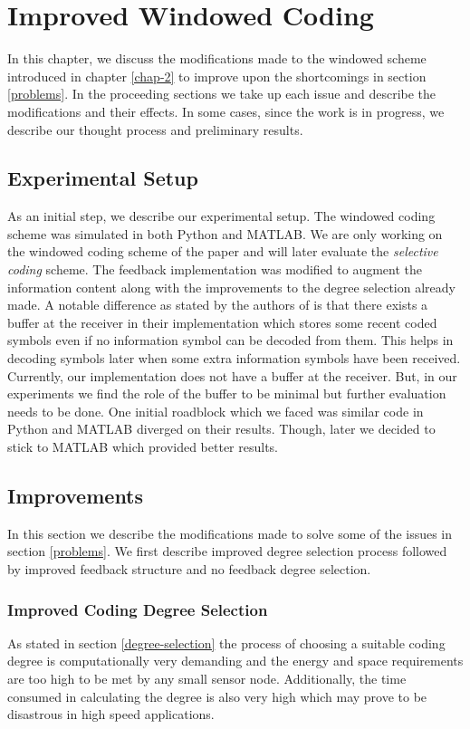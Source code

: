 \chapter{Improved Windowed Coding}
\label{chap-3}
\graphicspath{{Chapter_3/Vector/}{Chapter_3/}}

In this chapter, we discuss the modifications made to the windowed scheme introduced in chapter \ref{chap-2} to improve upon the shortcomings in section \ref{problems}. In the proceeding sections we take up each issue and describe the modifications and their effects. In some cases, since the work is in progress, we describe our thought process and preliminary results.

\section{Experimental Setup}
As an initial step, we describe our experimental setup. The windowed coding scheme was simulated in both Python and MATLAB. We are only working on the windowed coding scheme of the paper \cite{borkotokyicc} and will later evaluate the \textit{selective coding} scheme. The feedback implementation was modified to augment the information content along with the improvements to the degree selection already made. A notable difference as stated by the authors of \cite{borkotokyicc} is that there exists a buffer at the receiver in their implementation which stores some recent coded symbols even if no information symbol can be decoded from them. This helps in decoding symbols later when some extra information symbols have been received. Currently, our implementation does not have a buffer at the receiver. But, in our experiments we find the role of the buffer to be minimal but further evaluation needs to be done. One initial roadblock which we faced was similar code in Python and MATLAB diverged on their results. Though, later we decided to stick to MATLAB which provided better results.

\section{Improvements}
In this section we describe the modifications made to solve some of the issues in section \ref{problems}. We first describe improved degree selection process followed by improved feedback structure and no feedback degree selection.

\subsection{Improved Coding Degree Selection}
As stated in section \ref{degree-selection} the process of choosing a suitable coding degree is computationally very demanding and the energy and space requirements are too high to be met by any small sensor node. Additionally, the time consumed in calculating the degree is also very high which may prove to be disastrous in high speed applications. 

